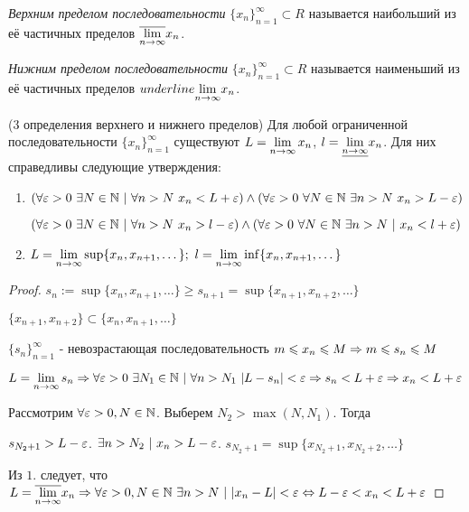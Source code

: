 \begin{definition}
	\textit{Верхним пределом последовательности} $\{x_n\}_{n = 1}^\infty \subset R$ называется наибольший из её частичных пределов $\overline{\lim\limits_{n \rightarrow \infty}} x_n$.
\end{definition}

\begin{definition}
	\textit{Нижним пределом последовательности} $\{x_n\}_{n = 1}^\infty \subset R$ называется наименьший из её частичных пределов $underline{\lim\limits_{n \rightarrow \infty}} x_n$.
\end{definition}

\begin{theorem} (3 определения верхнего и нижнего пределов)
	Для любой ограниченной последовательности $\{x_n\}_{n = 1}^\infty$ существуют $L = \lim\limits_{n \rightarrow \infty} x_n$, $l = \underline{\lim\limits_{n \rightarrow \infty}} x_n$. Для них справедливы следующие утверждения:
	\begin{enumerate}
		\item $(\forall \eps > 0\ \exists N \in \N\ |\ \forall n > N\ x_n < L + \eps) \wedge (\forall \eps > 0\ \forall N \in \N\ \exists n > N\ x_n > L - \eps)$
		
		$(\forall \eps > 0\ \exists N \in \N\ |\ \forall n > N\ x_n > l - \eps) \wedge (\forall \eps > 0\ \forall N \in \N\ \exists n > N\ |\ x_n < l + \eps)$
		
		\item $L = \lim\limits_{n \rightarrow \infty} \sup \{x_n, x_{n + 1}, \dots\};\ l = \lim\limits_{n \rightarrow \infty} \inf \{x_n, x_{n + 1}, \dots\}$
	\end{enumerate}
\end{theorem}

\begin{proof}
	$s_n := \sup \{x_n, x_{n + 1}, \dots\} \ge s_{n + 1} = \sup \{x_{n + 1}, x_{n + 2}, \dots\}$
	
	$\{x_{n + 1}, x_{n + 2}\} \subset \{x_n, x_{n + 1}, \dots\}$
	
	$\{s_n\}_{n = 1}^\infty$ - невозрастающая последовательность $m \leqslant x_n \leqslant M \Rightarrow m \leqslant s_n \leqslant M$
	
	$L = \lim\limits_{n \rightarrow \infty} s_n \Rightarrow \forall \varepsilon > 0\ \exists N_1 \in \mathbb{N}\ |\ \forall n > N_1\ |L - s_n| < \varepsilon \Rightarrow s_n < L + \varepsilon \Rightarrow x_n < L + \varepsilon$
	
	Рассмотрим $\forall \varepsilon > 0, N \in \mathbb{N}$. Выберем $N_2 > \max(N, N_1)$. Тогда
	
	$s_{N_2 + 1} > L - \varepsilon$. $\exists n > N_2\ |\ x_n > L - \varepsilon$.
	$s_{N_2 + 1} = \sup \{x_{N_2 + 1}, x_{N_2 + 2}, \dots\}$
	
	Из $1.$ следует, что $L = \overline{\liml_{n \ra \infty}} x_n \Ra \forall \eps > 0, N \in \N\ \exists n > N\ |\ |x_n - L| < \eps \lra L - \eps < x_n < L + \eps$
	
\end{proof}


